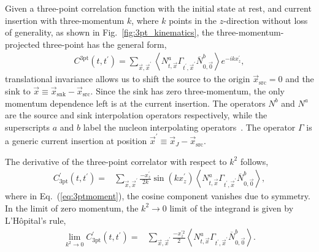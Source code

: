 \documentclass{PoS}
\begin{document}
Given a three-point correlation function with the initial state at rest, and current insertion with three-momentum $k$, where $k$ points in the $z$-direction without loss of generality, as shown in Fig.~\ref{fig:3pt_kinematics}, the three-momentum-projected three-point has the general form,
\begin{align}
C^{\text{3pt}}(t, t^\prime) = \sum_{\vec{x},\vec{x}^\prime} \left<N^a_{t,\vec{x}}\Gamma_{t^\prime,\vec{x}^\prime} \overline{N}^b_{0,\vec{0}}\right> e^{-ikx^\prime_z},
\label{eq:3pt}
\end{align}
translational invariance allows us to shift the source to the origin $\vec{x}_{\text{src}} = 0$ and the sink to $\vec{x}\equiv \vec{x}_{\text{snk}} - \vec{x}_{\text{src}}$. Since the sink has zero three-momentum, the only momentum dependence left is at the current insertion. The operators $N^b$ and $N^a$ are the source and sink interpolation operators respectively, while the superscripts $a$ and $b$ label the nucleon interpolating operators~\cite{Basak:2005ir,Basak:2007kj}. The operator $\Gamma$ is a generic current insertion at position $\vec{x}^\prime\equiv \vec{x}_J-\vec{x}_{\text{src}}$.

The derivative of the three-point correlator with respect to $k^2$ follows,
\begin{align}
C^\prime_{\text{3pt}}(t, t^\prime)
=& \sum_{\vec{x},\vec{x}^\prime} \frac{-x^\prime_z}{2k}\sin\left(kx^\prime_z\right) \left<N^a_{t,\vec{x}}\Gamma_{t^\prime,\vec{x}^\prime} \overline{N}^b_{0,\vec{0}}\right>, 
\label{eq:3ptmoment}
\end{align}
where in Eq.~(\ref{eq:3ptmoment}), the cosine component vanishes due to symmetry. In the limit of zero momentum, the $k^2 \rightarrow 0$ limit of the integrand is given by L'H\^opital's rule,
\begin{align}
\lim_{k^2 \rightarrow 0} C^\prime_{\text{3pt}}(t, t^\prime) = & \sum_{\vec{x},\vec{x}^\prime}\frac{-x^{\prime 2}_z}{2}\left<N^a_{t,\vec{x}}\Gamma_{t^\prime,\vec{x}^\prime} \overline{N}^b_{0,\vec{0}}\right>.
\label{eq:3ptmoment0}
\end{align}
\end{document}
